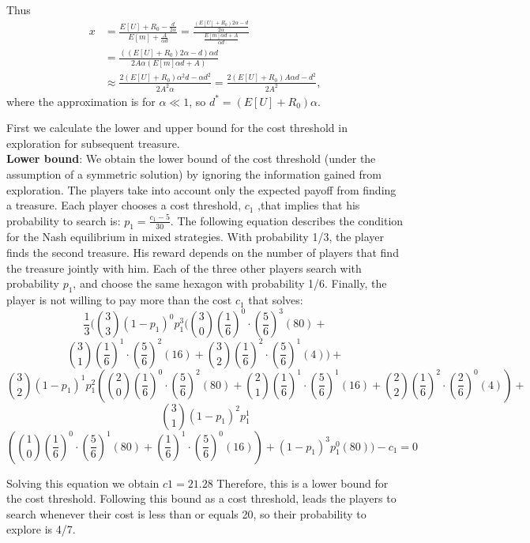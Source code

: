 {Thus 
\begin{align*}
x &= \frac{E[U]+R_0 - \frac{d}{2\alpha}}{E[m] +\frac{A}{\alpha d} } = \frac{\frac{(E[U]+R_0)2\alpha-d}{2\alpha}}{\frac{E[m]\alpha d+A}{\alpha d}}\\
&=\frac{((E[U]+R_0)2\alpha-d)\alpha d}{2A\alpha(E[m]\alpha d+A)}\\
&\approx \frac{2(E[U]+R_0)\alpha^2 d -\alpha d^2}{2A^2\alpha} = \frac{2(E[U]+R_0)A\alpha d - d^2}{2A^2}, 
\end{align*}
where the approximation is for $\alpha \ll 1$,
so $d^*=(E[U]+R_0)\alpha$.

}

First we calculate the lower and upper bound for the cost threshold in exploration for subsequent treasure.\\
\textbf{Lower bound}:
We obtain the lower bound of the cost threshold (under the assumption of a symmetric solution) by ignoring the information gained from exploration. The players take into account only the expected payoff from finding a treasure. Each player chooses a cost threshold, $c_1$ ,that implies that his probability to search is: $p_1=\frac{c_1-5}{30}$. The following equation describes the condition for the Nash equilibrium in mixed strategies. With probability 1/3, the player finds the second treasure. His reward depends on the number of players that find the treasure jointly with him. Each of the three other players search with probability $p_1$, and choose the same hexagon with probability 1/6. Finally, the player is not willing to pay more than the cost $c_1$ that solves: 
$$\frac{1}{3}(\binom{3}{3}(1-p_1)^0 p_1^3 ( \binom{3}{0}(\frac{1}{6})^0\cdot(\frac{5}{6})^3 (80) + $$$$
       \binom{3}{1}(\frac{1}{6})^1\cdot(\frac{5}{6})^2 (16) + 
       \binom{3}{2}(\frac{1}{6})^2\cdot(\frac{5}{6})^1 (4)) + 
    $$$$\binom{3}{2}(1 - p_1)^1 p_1^2 (\binom{2}{0}(\frac{1}{6})^0\cdot(\frac{5}{6})^2 (80) + 
       \binom{2}{1}(\frac{1}{6})^1\cdot(\frac{5}{6})^1 (16) + 
       \binom{2}{2}(\frac{1}{6})^2\cdot(\frac{2}{6})^0 (4)) + 
$$$$\binom{3}{1} (1 - p_1)^2 p_1^1$$$$ (\binom{1}{0}(\frac{1}{6})^0\cdot(\frac{5}{6})^1 (80) + 
       (\frac{1}{6})^1\cdot(\frac{5}{6})^0 (16)) + (1 - 
       p_1)^3 p_1^0 (80))-c_1=0$$ 

Solving this equation we obtain $c1=21.28$ Therefore, this is a lower bound for the cost threshold. Following this bound as a cost threshold, leads the players to search whenever their cost is less than or equals 20, so their probability to explore is 4/7. 


